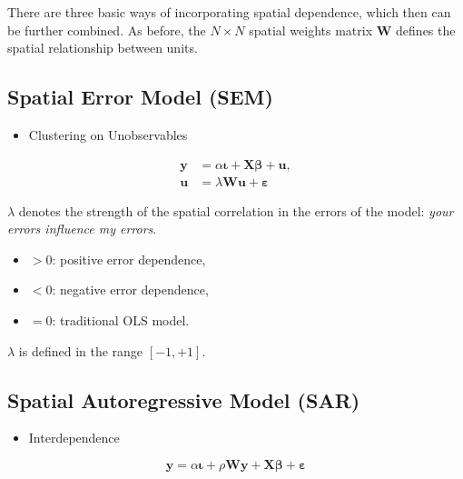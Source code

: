 \documentclass[
  letterpaper,
]{scrbook}
\providecommand{\tightlist}{%
  \setlength{\itemsep}{0pt}\setlength{\parskip}{0pt}}\usepackage{longtable,booktabs,array}
\begin{document}
There are three basic ways of incorporating spatial dependence, which
then can be further combined. As before, the \(N \times N\) spatial
weights matrix \(\boldsymbol{\mathbf{W}}\) defines the spatial
relationship between units.

\hypertarget{spatial-error-model-sem}{%
\subsection{Spatial Error Model (SEM)}\label{spatial-error-model-sem}}

\begin{itemize}
\tightlist
\item
  Clustering on Unobservables
\end{itemize}

\[
        \begin{split}
        {\boldsymbol{\mathbf{y}}}&=\alpha{\boldsymbol{\mathbf{\iota}}}+{\boldsymbol{\mathbf{X}}}{\boldsymbol{\mathbf{\beta}}}+{\boldsymbol{\mathbf{u}}},\\
        {\boldsymbol{\mathbf{u}}}&=\lambda{\boldsymbol{\mathbf{W}}}{\boldsymbol{\mathbf{u}}}+{\boldsymbol{\mathbf{\varepsilon}}}
        \end{split} 
\]

\(\lambda\) denotes the strength of the spatial correlation in the
errors of the model: \emph{your errors influence my errors}.

\begin{itemize}
\tightlist
\item
  \(> 0\): positive error dependence,
\item
  \(< 0\): negative error dependence,
\item
  \(= 0\): traditional OLS model.
\end{itemize}

\(\lambda\) is defined in the range \([-1, +1]\).

\hypertarget{spatial-autoregressive-model-sar}{%
\subsection{Spatial Autoregressive Model
(SAR)}\label{spatial-autoregressive-model-sar}}

\begin{itemize}
\tightlist
\item
  Interdependence
\end{itemize}

\[
        {\boldsymbol{\mathbf{y}}}=\alpha{\boldsymbol{\mathbf{\iota}}}+\rho{\boldsymbol{\mathbf{W}}}{\boldsymbol{\mathbf{y}}}+{\boldsymbol{\mathbf{X}}}{\boldsymbol{\mathbf{\beta}}}+ {\boldsymbol{\mathbf{\varepsilon}}}
\]
\end{document}
